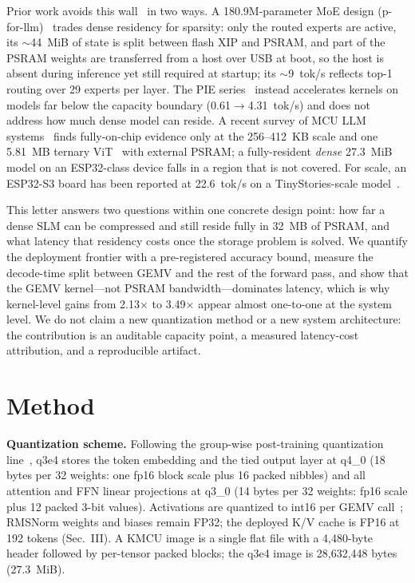 \documentclass[journal,letterpaper]{IEEEtran}
\begin{document}
Prior work avoids this wall~\cite{memorywall} in two ways. A 180.9M-parameter MoE design (p-for-llm)~\cite{pforllm} trades
dense residency for sparsity: only the routed experts are active, its $\sim$44~MiB of state
is split between flash XIP and PSRAM, and part of the PSRAM weights are transferred from a
host over USB at boot, so the host is absent during inference yet still required at startup;
its $\sim$9~tok/s reflects top-1 routing over 29 experts per layer. The PIE series~\cite{pie} instead
accelerates kernels on models far below the capacity boundary (0.61$\rightarrow$4.31~tok/s)
and does not address how much dense model can reside. A recent survey of MCU LLM systems~\cite{survey}
finds fully-on-chip evidence only at the 256--412~KB scale and one 5.81~MB ternary ViT~\cite{ternaryvit} with
external PSRAM; a fully-resident \emph{dense} 27.3~MiB model on an ESP32-class device falls
in a region that is not covered. For scale, an ESP32-S3 board has been reported at 22.6~tok/s on a TinyStories-scale model~\cite{edgebench}.

This letter answers two questions within one concrete design point: how far a dense SLM can be
compressed and still reside fully in 32~MB of PSRAM, and what latency that residency costs once
the storage problem is solved. We quantify the deployment frontier with a pre-registered
accuracy bound, measure the decode-time split between GEMV and the rest of the forward pass,
and show that the GEMV kernel---not PSRAM bandwidth---dominates latency, which is why
kernel-level gains from 2.13$\times$ to 3.49$\times$ appear almost one-to-one at the system level. We do not claim a new
quantization method or a new system architecture: the contribution is an auditable capacity point,
a measured latency-cost attribution, and a reproducible artifact.

\section{Method}
\textbf{Quantization scheme.} Following the group-wise post-training quantization line~\cite{gptq,awq,llmint8}, q3e4 stores the token embedding and the tied output layer at
q4\_0 (18 bytes per 32 weights: one fp16 block scale plus 16 packed nibbles) and all attention
and FFN linear projections at q3\_0 (14 bytes per 32 weights: fp16 scale plus 12 packed
3-bit values). Activations are quantized to int16 per GEMV call~\cite{int16}; RMSNorm weights and biases remain FP32; the deployed K/V cache is FP16 at 192 tokens (Sec.~III). A KMCU image is a single flat file with a 4,480-byte header followed
by per-tensor packed blocks; the q3e4 image is 28,632,448 bytes (27.3~MiB).
\end{document}
